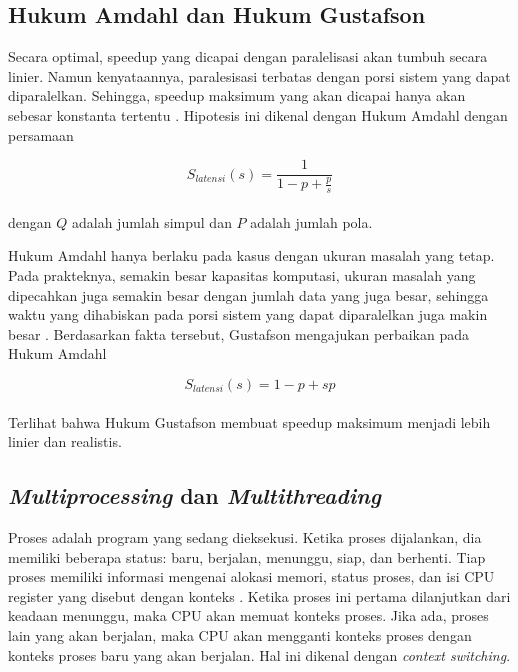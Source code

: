   \blindtext

  \subsection{Hukum Amdahl dan Hukum Gustafson}

    Secara optimal, speedup yang dicapai dengan paralelisasi akan tumbuh secara linier. Namun kenyataannya, paralesisasi terbatas dengan porsi sistem yang dapat diparalelkan. Sehingga, speedup maksimum yang akan dicapai hanya akan sebesar konstanta tertentu \citep{amdahl}. Hipotesis ini dikenal dengan Hukum Amdahl dengan persamaan

    \begin{equation}
      S_{latensi}(s) = \frac{1}{1 - p + \frac{p}{s}}
    \end{equation} \\
    dengan $Q$ adalah jumlah simpul dan $P$ adalah jumlah pola.

    Hukum Amdahl hanya berlaku pada kasus dengan ukuran masalah yang tetap. Pada prakteknya, semakin besar kapasitas komputasi, ukuran masalah yang dipecahkan juga semakin besar dengan jumlah data yang juga besar, sehingga waktu yang dihabiskan pada porsi sistem yang dapat diparalelkan juga makin besar \citep{gustafson}. Berdasarkan fakta tersebut, Gustafson mengajukan perbaikan pada Hukum Amdahl

    \begin{equation}
      S_{latensi}(s) = 1 - p + sp
    \end{equation} \\

    Terlihat bahwa Hukum Gustafson membuat speedup maksimum menjadi lebih linier dan realistis.

  \subsection{\emph{Multiprocessing} dan \emph{Multithreading}}

    Proses adalah program yang sedang dieksekusi. Ketika proses dijalankan, dia memiliki beberapa status: baru, berjalan, menunggu, siap, dan berhenti. Tiap proses memiliki informasi mengenai alokasi memori, status proses, dan isi CPU register yang disebut dengan konteks \citep{os}. Ketika proses ini pertama dilanjutkan dari keadaan menunggu, maka CPU akan memuat konteks proses. Jika ada, proses lain yang akan berjalan, maka CPU akan mengganti konteks proses dengan konteks proses baru yang akan berjalan. Hal ini dikenal dengan \emph{context switching}.

